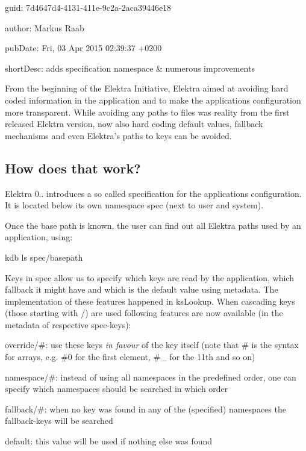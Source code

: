 
\begin{DoxyItemize}
\item guid\+: 7d4647d4-\/4131-\/411e-\/9c2a-\/2aca39446e18
\item author\+: Markus Raab
\item pub\+Date\+: Fri, 03 Apr 2015 02\+:39\+:37 +0200
\item short\+Desc\+: adds specification namespace \& numerous improvements
\end{DoxyItemize}

From the beginning of the Elektra Initiative, Elektra aimed at avoiding hard coded information in the application and to make the application\textquotesingle{}s configuration more transparent. While avoiding any paths to files was reality from the first released Elektra version, now also hard coding default values, fallback mechanisms and even Elektra’s paths to keys can be avoided.

\subsection*{How does that work?}

Elektra 0.. introduces a so called specification for the application\textquotesingle{}s configuration. It is located below its own namespace {\ttfamily spec} (next to user and system).

Once the base path is known, the user can find out all Elektra paths used by an application, using\+: \begin{DoxyVerb}kdb ls spec/basepath
\end{DoxyVerb}


Keys in {\ttfamily spec} allow us to specify which keys are read by the application, which fallback it might have and which is the default value using metadata. The implementation of these features happened in {\ttfamily ks\+Lookup}. When cascading keys (those starting with {\ttfamily /}) are used following features are now available (in the metadata of respective {\ttfamily spec}-\/keys)\+:


\begin{DoxyItemize}
\item {\ttfamily override/\#}\+: use these keys {\itshape in favour} of the key itself (note that {\ttfamily \#} is the syntax for arrays, e.\+g. {\ttfamily \#0} for the first element, {\ttfamily \#\+\_} for the 11th and so on)
\item {\ttfamily namespace/\#}\+: instead of using all namespaces in the predefined order, one can specify which namespaces should be searched in which order
\item {\ttfamily fallback/\#}\+: when no key was found in any of the (specified) namespaces the {\ttfamily fallback}-\/keys will be searched
\item {\ttfamily default}\+: this value will be used if nothing else was found
\end{DoxyItemize}

